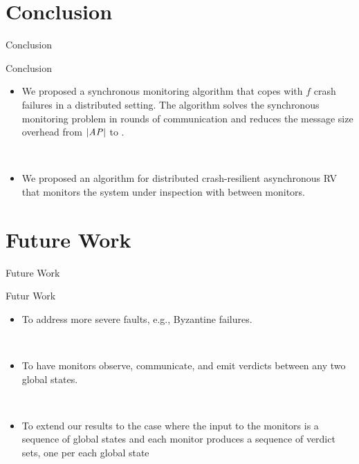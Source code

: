 
\section{Conclusion}
\begin{frame}{Conclusion}

\begin{block}{Conclusion}
\begin{itemize}

\item We proposed a synchronous monitoring algorithm that copes with $f$ crash failures in a distributed setting. The algorithm solves the synchronous monitoring problem in  rounds of communication and reduces the message size overhead from $|\mathit{AP}|$ to .

\ \\

\item We proposed an algorithm for distributed crash-resilient asynchronous RV that  monitors the system under inspection with  between monitors. 

\end{itemize}
\end{block}
\end{frame}



\section{Future Work}
\begin{frame}{Future Work}

\begin{block}{Futur Work}
\begin{itemize}

\item To address more severe faults, e.g., Byzantine failures. 

\ \\

\item To have monitors observe, communicate, and emit verdicts between any two global states.

\ \\ 

\item To extend our results to the case where the input to the monitors is a sequence of global states and each monitor produces a sequence of verdict sets, one per each global state


\end{itemize}
\end{block}
\end{frame}



